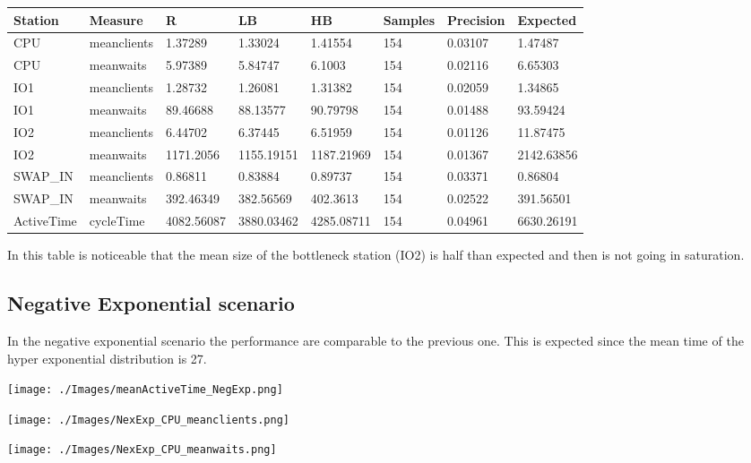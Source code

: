 \documentclass[12pt,a4paper]{article}
\begin{document}
\begin{table}[!ht]
    \centering
    \begin{tabular}{|l|l|l|l|l|l|l|l|}
    \hline
        Station & Measure & R & LB & HB & Samples & Precision & Expected \\ \hline
        CPU & meanclients & 1.37289 & 1.33024 & 1.41554 & 154 & 0.03107 & 1.47487 \\ \hline
        CPU & meanwaits & 5.97389 & 5.84747 & 6.1003 & 154 & 0.02116 & 6.65303 \\ \hline
        IO1 & meanclients & 1.28732 & 1.26081 & 1.31382 & 154 & 0.02059 & 1.34865 \\ \hline
        IO1 & meanwaits & 89.46688 & 88.13577 & 90.79798 & 154 & 0.01488 & 93.59424 \\ \hline
        IO2 & meanclients & 6.44702 & 6.37445 & 6.51959 & 154 & 0.01126 & 11.87475 \\ \hline
        IO2 & meanwaits & 1171.2056 & 1155.19151 & 1187.21969 & 154 & 0.01367 & 2142.63856 \\ \hline
        SWAP\_IN & meanclients & 0.86811 & 0.83884 & 0.89737 & 154 & 0.03371 & 0.86804 \\ \hline
        SWAP\_IN & meanwaits & 392.46349 & 382.56569 & 402.3613 & 154 & 0.02522 & 391.56501 \\ \hline
        ActiveTime & cycleTime & 4082.56087 & 3880.03462 & 4285.08711 & 154 & 0.04961 & 6630.26191 \\ \hline
    \end{tabular}
\end{table}
In this table is noticeable that the mean size of the bottleneck station (IO2) is half than expected and then is not going in saturation. 

\subsection{Negative Exponential scenario}

In the negative exponential scenario the performance are comparable to the previous one. This is expected since the mean time of the hyper exponential distribution is 27. 

\texttt{[image: ./Images/meanActiveTime\_NegExp.png]}

\texttt{[image: ./Images/NexExp\_CPU\_meanclients.png]}

\texttt{[image: ./Images/NexExp\_CPU\_meanwaits.png]}
\end{document}
